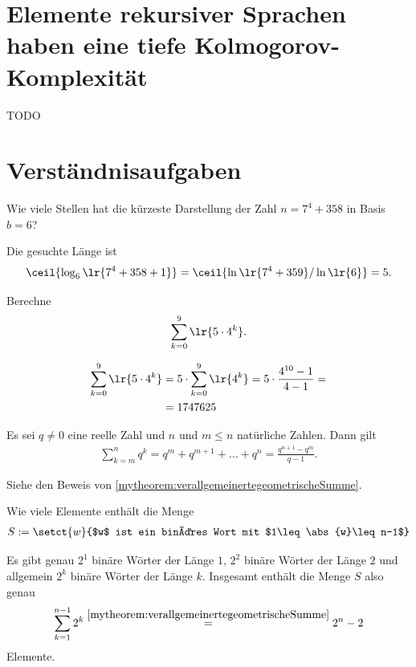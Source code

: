 \section{Elemente rekursiver Sprachen haben eine tiefe Kolmogorov-Komplexität}
TODO

\clearpage
\section{Verständnisaufgaben}

\begin{myexercise}
	Wie viele Stellen hat die kürzeste Darstellung der Zahl $n = 7^4 + 358$ in Basis $b = 6$?
	\begin{myanswer}
		Die gesuchte Länge ist
		\begin{align*}
			\ceil{\log_6\lr{7^4 + 358 + 1}} = \ceil{\ln\lr{7^4 + 359} / \ln\lr{6}} = 5.
		\end{align*}
	\end{myanswer}
\end{myexercise}

\begin{myexercise}
	Berechne
	\begin{align*}
		\sum_{k=0}^9 \lr{5 \cdot 4^k}.
	\end{align*}

	\begin{myanswer}
		\begin{align*}
			\sum_{k=0}^9 \lr{5 \cdot 4^k} &= 5\cdot \sum_{k=0}^9 \lr{4^k} = 5\cdot \frac{4^{10} - 1}{4 - 1} =\\
			&= 1747625
		\end{align*}
	\end{myanswer}
\end{myexercise}

\begin{myexercise}
		Es sei $q \neq 0$ eine reelle Zahl und $n$ und $m\leq n$ natürliche Zahlen. Dann gilt
	\begin{align*}
		\sum_{k = m}^n q^k = q^m + q^{m+1} + \ldots + q^n = \frac{q^{n+1}-q^m}{q-1}.
	\end{align*}
	\begin{myanswer}
		Siehe den Beweis von \cref{mytheorem:verallgemeinertegeometrischeSumme}.
	\end{myanswer}
\end{myexercise}

\begin{myexercise}
		Wie viele Elemente enthält die Menge
	\begin{align*}
		S := \setct{w}{$w$ ist ein binäres Wort mit $1\leq\abs{w}\leq n-1$}
	\end{align*}
	\begin{myanswer}
		Es gibt genau $2^1$ binäre Wörter der Länge $1$, $2^2$ binäre Wörter der Länge $2$ und allgemein $2^k$ binäre Wörter der Länge $k$. Insgesamt enthält die Menge $S$ also genau
		\begin{align*}
			\sum_{k = 1}^{n-1} 2^k \stackrel{\cref{mytheorem:verallgemeinertegeometrischeSumme}}{=} 2^n - 2
		\end{align*}
		Elemente.
	\end{myanswer}
\end{myexercise}